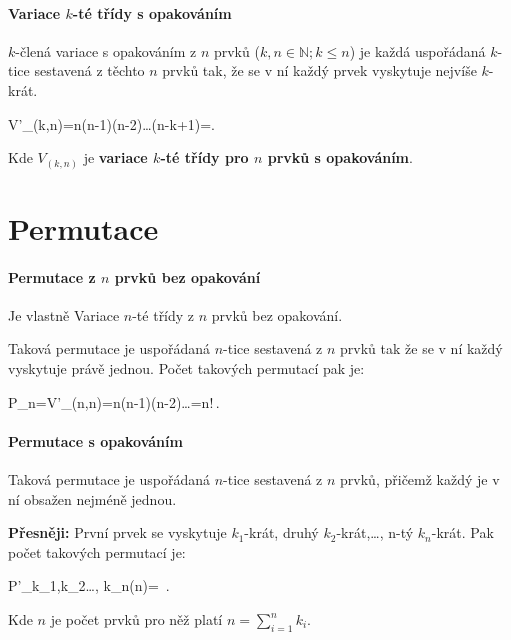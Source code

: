 \documentclass[12pt,a4wide,oneside,
headings]{report}
\newenvironment{eq}{\begin{tcolorbox}[ams equation,colback=yourcolor!10!white,colframe=yourcolor]}{\end{tcolorbox}}
\begin{document}
\paragraph{Variace $k$-té třídy s opakováním} $k$-člená variace s opakováním z $n$ prvků ($k,n \in \mathbb{N};k\leqslant n$) je každá uspořádaná $k$-tice sestavená z těchto $n$ prvků tak, že se v ní každý prvek vyskytuje nejvíše $k$-krát.
\begin{eq}
V'_{\left(k,n\right)}=n\cdot(n-1)\cdot(n-2)\cdot\ldots\cdot(n-k+1)=.
\end{eq}
Kde $V_{(k,n)}$ je \textbf{variace $k$-té třídy pro $n$ prvků s opakováním}.

\section{Permutace}
\paragraph{Permutace z $n$ prvků bez opakování}
Je vlastně Variace $n$-té třídy z $n$ prvků bez opakování.

Taková permutace je uspořádaná $n$-tice sestavená z $n$ prvků tak že se v ní každý vyskytuje právě jednou. Počet takových permutací pak je:
\begin{eq}
P_{n}=V'_{\left(n,n\right)}=n\cdot(n-1)\cdot(n-2)\cdot\ldots{}=n!\,.
\end{eq}

\paragraph{Permutace s opakováním} Taková permutace je uspořádaná $n$-tice sestavená z $n$ prvků, přičemž každý je v ní obsažen nejméně jednou.

\textbf{Přesněji:} První prvek se vyskytuje $k_1$-krát, druhý $k_2$-krát,\ldots, n-tý $k_n$-krát. Pak počet takových permutací je:
\begin{eq}
P'_{k_1,k_2\ldots, k_n}(n)=  \,.
\end{eq}

Kde $n$ je počet prvků pro něž platí $n=\sum\limits_{i=1}^{n}k_i$.

\listoffigures
\listoftables
\end{document}
